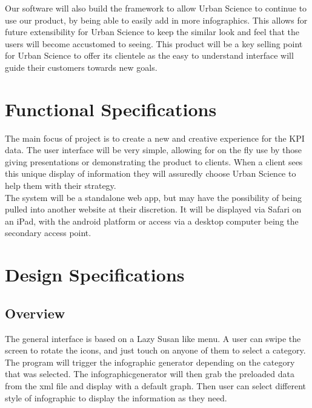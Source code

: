 \documentclass[11pt,a4paper,oneside]{article}
\begin{document}
Our software will also build the framework to allow Urban Science to continue to use our product, by being able to easily add in more infographics. This allows for future extensibility for Urban Science to keep the similar look and feel that the users will become accustomed to seeing. This product will be a key selling point for Urban Science to offer its clientele as the easy to understand interface will guide their customers towards new goals.\\


\section{Functional Specifications}

The main focus of project is to create a new and creative experience for the KPI data. The user interface will be very simple, allowing for on the fly use by those giving presentations or demonstrating the product to clients. When a client sees this unique display of information they will assuredly choose Urban Science to help them with their strategy.\\

The system will be a standalone web app, but may have the possibility of being pulled into another website at their discretion. It will be displayed via Safari on an iPad, with the android platform or access via a desktop computer being the secondary access point.\\


\section{Design Specifications}

\subsection{Overview}

The general interface is based on a Lazy Susan like menu. A user can swipe the screen to rotate the icons, and just touch on anyone of them to select a category. The program will trigger the infographic generator depending on the category that was selected. The infographicgenerator will then grab the preloaded data from the xml file and display with a default graph. Then user can select different style of infographic to display the information as they need.\\
\end{document}
